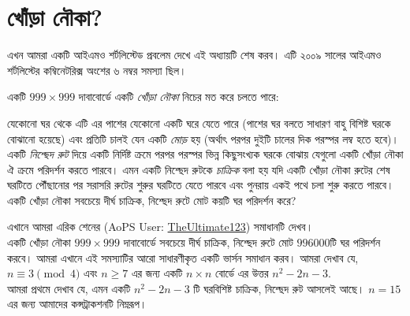 \documentclass[11pt]{report}
\begin{document}
\section{খোঁড়া নৌকা?}

এখন আমরা একটি আইএমও শর্টলিস্টেড প্রবলেম দেখে এই অধ্যায়টি শেষ করব। এটি ২০০৯ সালের আইএমও শর্টলিস্টের কম্বিনেটরিক্স অংশের ৬ নম্বর সমস্যা ছিল।\\

\begin{tcolorbox}[colframe=black!80!green,title=IMO SL 2009]
একটি $999 \times 999$ দাবাবোর্ডে একটি \textit{খোঁড়া নৌকা} নিচের মত করে চলতে পারে:

যেকোনো ঘর থেকে এটি এর পাশের যেকোনো একটি ঘরে যেতে পারে (পাশের ঘর বলতে সাধারণ বাহু বিশিষ্ট ঘরকে বোঝানো হয়েছে) এবং প্রতিটি চালই যেন একটি \textit{মোড়} হয় (অর্থাৎ পরপর দুইটি চালের দিক পরস্পর লম্ব হতে হবে)। একটি \textit{নিশ্ছেদ রুট} দিয়ে একটি নির্দিষ্ট ক্রমে পরপর পরস্পর ভিন্ন কিছুসংখ্যক ঘরকে বোঝায় যেগুলো একটি খোঁড়া নৌকা ঐ ক্রমে পরিদর্শন করতে পারবে। এমন একটি নিশ্ছেদ রুটকে \textit{চাক্রিক} বলা হয় যদি একটি খোঁড়া নৌকা রুটের শেষ ঘরটিতে পৌঁছানোর পর সরাসরি রুটের শুরুর ঘরটিতে যেতে পারবে এবং পুনরায় একই পথে চলা শুরু করতে পারবে। একটি খোঁড়া নৌকা সবচেয়ে দীর্ঘ চাক্রিক, নিশ্ছেদ রুটে মোট কয়টি ঘর পরিদর্শন করে?
\end{tcolorbox}

এখানে আমরা এরিক শেনের (AoPS User: \href{https://artofproblemsolving.com/community/user/265663}{TheUltimate123}) সমাধানটি দেখব।\\

একটি খোঁড়া নৌকা $999 \times 999$ দাবাবোর্ডে সবচেয়ে দীর্ঘ চাক্রিক, নিশ্ছেদ রুটে মোট $996000$টি ঘর পরিদর্শন করবে। আমরা এখানে এই সমস্যাটির আরো সাধারণীকৃত একটি ভার্সন সমাধান করব। আমরা দেখাব যে, $n \equiv 3 \pmod 4$ এবং $n \geq 7$ এর জন্য একটি $n \times n$ বোর্ডে এর উত্তর $n^2 - 2n -3.$\\

আমরা প্রথমে দেখাব যে, এমন একটি $n^2-2n-3$ টি ঘরবিশিষ্ট চাক্রিক, নিশ্ছেদ রুট আসলেই আছে। $n = 15$ এর জন্য আমাদের কন্সট্রাকশনটি নিম্নরূপ।
\end{document}
